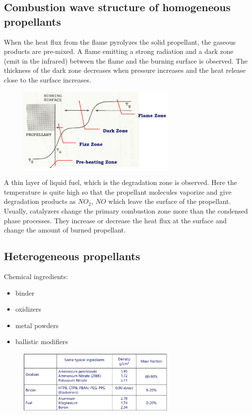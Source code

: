\documentclass[12pt]{article}
\begin{document}
\subsection{Combustion wave structure of homogeneous propellants}

When the heat flux from the flame pyrolyzes the solid propellant, the gaseous products are pre-mixed. A flame emitting a strong radiation and a dark zone (emit in the infrared) between the flame and the burning surface is observed. The thickness of the dark zone decreases when pressure increases and the heat release close to the surface increases.

\begin{figure}[!ht]
\centering
\includegraphics[width=0.7\textwidth]{figures/homo2.png}
\end{figure}

A thin layer of liquid fuel, which is the degradation zone is observed. Here the temperature is quite high so that the propellant molecules vaporize and give degradation products as $NO_{2}$, $NO$ which leave the surface of the propellant. Usually, catalyzers change the primary combustion zone more than the condensed phase processes. They increase or decrease the heat flux at the surface and change the amount of burned propellant.

\subsection{Heterogeneous propellants}

Chemical ingredients:

\begin{itemize}
  \item binder
  \item oxidizers
  \item metal powders
  \item ballistic modifiers
\end{itemize}

\begin{figure}[!ht]
\centering
\includegraphics[width=0.7\textwidth]{figures/hetetable.png}
\end{figure}
\end{document}
